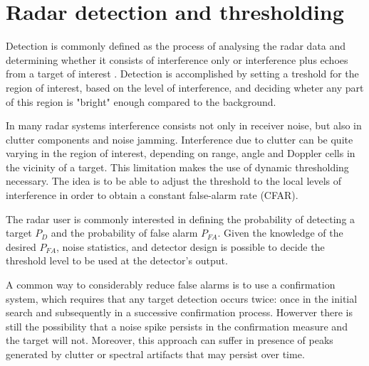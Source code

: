\chapter{Radar detection and thresholding}
\label{chap:radar thresholding}

Detection is commonly defined as the process of analysing the radar data and determining whether it consists of interference only or interference plus echoes from a target of interest \cite{Richards_Scheer_Holm_2010}. Detection is accomplished by setting a treshold for the region of interest, based on the level of interference, and deciding wheter any part of this region is "bright" enough compared to the background.

In many radar systems interference consists not only in receiver noise, but also in clutter components and noise jamming. Interference due to clutter can be quite varying in the region of interest, depending on range, angle and Doppler cells in the vicinity of a target. This limitation makes the use of dynamic thresholding necessary. The idea is to be able to adjust the threshold to the local levels of interference in order to obtain a constant false-alarm rate (CFAR).


The radar user is commonly interested in defining the probability of detecting a target $P_D$ and the probability of false alarm $P_{FA}$. Given the knowledge of the desired $P_{FA}$, noise statistics, and detector design is possible to decide the threshold level to be used at the detector's output.


A common way to considerably reduce false alarms is to use a confirmation system, which requires that any target detection occurs twice: once in the initial search and subsequently in a successive confirmation process.
Howerver there is still the possibility that a noise spike persists in the confirmation measure and the target will not. Moreover, this approach can suffer in presence of peaks generated by clutter or spectral artifacts that may persist over time. 

